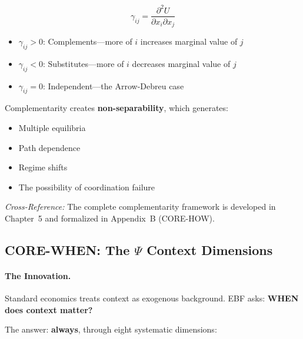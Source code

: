 \begin{equation}
\gamma_{ij} = \frac{\partial^2 U}{\partial x_i \partial x_j}
\end{equation}

\begin{itemize}
\item $\gamma_{ij} > 0$: Complements---more of $i$ increases marginal value of $j$
\item $\gamma_{ij} < 0$: Substitutes---more of $i$ decreases marginal value of $j$
\item $\gamma_{ij} = 0$: Independent---the Arrow-Debreu case
\end{itemize}

Complementarity creates \textbf{non-separability}, which generates:
\begin{itemize}[nosep]
\item Multiple equilibria
\item Path dependence
\item Regime shifts
\item The possibility of coordination failure
\end{itemize}

\textit{Cross-Reference:} The complete complementarity framework is developed
in Chapter~5 and formalized in Appendix~B (CORE-HOW).

\subsection{CORE-WHEN: The $\Psi$ Context Dimensions}
\label{sec:8c-when}

\paragraph{The Innovation.}
Standard economics treats context as exogenous background. EBF asks:
\textbf{WHEN does context matter?}

The answer: \textbf{always}, through eight systematic dimensions:

